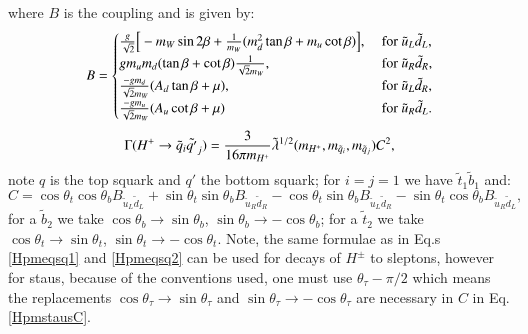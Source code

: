 \documentclass[final,3p,times,pdflatex]{elsarticle}
\begin{document}
where $B$ is the coupling and is given by:
\begin{equation}
B = \begin{cases}
		{g \over \sqrt{2}}\Big[-m_W \sin2\beta + {1 \over m_W}(m_{d}^2 \tan \beta + m_{u}\cot\beta)\Big], &$  for $  \tilde{u}_L \tilde{d}_L, \\
		gm_u m_d (\tan\beta + \cot\beta){1 \over \sqrt{2} m_W}, &$  for $ \tilde{u}_R \tilde{d}_R, \\
		{-g m_d \over \sqrt{2} m_W}(A_d \tan\beta + \mu), &$  for $ \tilde{u}_L \tilde{d}_R, \\
		{-gm_u \over \sqrt{2}m_W}(A_u \cot \beta + \mu) &$  for $ \tilde{u}_R \tilde{d}_L. \\
		\end{cases}
\end{equation}
\begin{equation} \label{Hpmeqsq2}
\Gamma(H^+ \rightarrow \tilde{q}_i \tilde{q'}_j) = {3 \over 16 \pi m_{H^+}} \tilde{\lambda}^{1/2}(m_{H^+},m_{\tilde{q}_i}, m_{\tilde{q}_j}) C^2,
\end{equation} 
note $q$ is the top squark and $q'$ the bottom squark; for $i=j=1$ we have $\tilde{t}_1 \tilde{b}_1$ and:
\begin{equation} \label{HpmstausC}
C = \cos\theta_t \cos\theta_b B_{\tilde{u}_L \tilde{d}_L} + \sin\theta_t \sin\theta_b B_{\tilde{u}_R \tilde{d}_R} - \cos\theta_t \sin\theta_b B_{\tilde{u}_L \tilde{d}_R} - \sin\theta_t \cos\theta_b B_{\tilde{u}_R \tilde{d}_L},
\end{equation}
for a $\tilde{b}_2$ we take $ \cos\theta_b \rightarrow \sin \theta_b$, $\sin\theta_b \rightarrow -\cos\theta_b$;
for a $\tilde{t}_2$ we take $ \cos\theta_t \rightarrow \sin \theta_t$, $\sin\theta_t \rightarrow -\cos\theta_t$.
Note, the same formulae as in Eq.s \eqref{Hpmeqsq1} and \eqref{Hpmeqsq2} can be used for decays of $H^{\pm}$ to sleptons, however for staus, because of the conventions used, one must use $\theta_{\tau} - \pi/2$ which means the replacements  $\cos\theta_{\tau} \rightarrow \sin\theta_{\tau}$ and $\sin\theta_{\tau} \rightarrow -\cos\theta_{\tau}$ are necessary in $C$ in Eq. \eqref{HpmstausC}.
\end{document}
